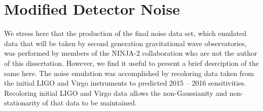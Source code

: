 \section{Modified Detector Noise}
\label{sec:noise}

We stress here that the production of the final noise data set, which emulated data
that will be taken by second generation gravitational wave observatories, 
was performed by members of the NINJA-2 collaboration who are not the author 
of this dissertation.  
However, we find it useful to present a brief desrciption of the same here.
The noise emulation 
was accomplished by recoloring data taken from the initial LIGO and Virgo 
instruments to predicted 2015 -- 2016 sensitivities. Recoloring initial LIGO 
and 
Virgo data allows the non-Gaussianity and non-stationarity of that data to be 
maintained.

